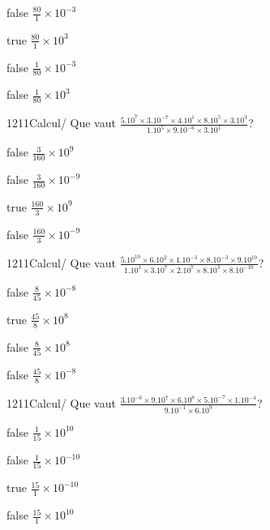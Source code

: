             \begin{reponses}
                \item[false] $\frac{80}{1}\times 10^{-3}$
                \item[true] $\frac{80}{1}\times 10^{3}$
                \item[false] $\frac{1}{80}\times 10^{-3}$
                \item[false] $\frac{1}{80}\times 10^{3}$
            \end{reponses}
            \begin{question}{1211}{Calcul}{}{/}
                Que vaut $\frac{5.10^{7}\times 3.10^{-7}\times 4.10^{1}\times 8.10^{5}\times 3.10^{3}}{1.10^{5}\times 9.10^{-6}\times 3.10^{1}}$?
            \end{question}
            \begin{reponses}
                \item[false] $\frac{3}{160}\times 10^{9}$
                \item[false] $\frac{3}{160}\times 10^{-9}$
                \item[true] $\frac{160}{3}\times 10^{9}$
                \item[false] $\frac{160}{3}\times 10^{-9}$
            \end{reponses}
            \begin{question}{1211}{Calcul}{}{/}
                Que vaut $\frac{5.10^{10}\times 6.10^{2}\times 1.10^{-3}\times 8.10^{-3}\times 9.10^{10}}{1.10^{1}\times 3.10^{7}\times 2.10^{7}\times 8.10^{3}\times 8.10^{-10}}$?
            \end{question}
            \begin{reponses}
                \item[false] $\frac{8}{45}\times 10^{-8}$
                \item[true] $\frac{45}{8}\times 10^{8}$
                \item[false] $\frac{8}{45}\times 10^{8}$
                \item[false] $\frac{45}{8}\times 10^{-8}$
            \end{reponses}
            \begin{question}{1211}{Calcul}{}{/}
                Que vaut $\frac{3.10^{-6}\times 9.10^{7}\times 6.10^{8}\times 5.10^{-7}\times 1.10^{-4}}{9.10^{-1}\times 6.10^{9}}$?
            \end{question}
            \begin{reponses}
                \item[false] $\frac{1}{15}\times 10^{10}$
                \item[false] $\frac{1}{15}\times 10^{-10}$
                \item[true] $\frac{15}{1}\times 10^{-10}$
                \item[false] $\frac{15}{1}\times 10^{10}$
            \end{reponses}
